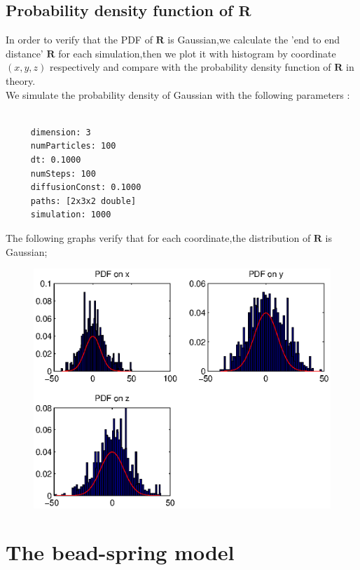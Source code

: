 \documentclass{article}
\begin{document}
\subsection{Probability density function of $\bm{R}$ }
In order to verify that the PDF of $\bm{R}$ is Gaussian,we calculate the 'end to end distance' $\bm{R}$ for each simulation,then we plot it with histogram by coordinate $(x,y,z)$ respectively and compare with the probability density function of $\bm{R}$ in theory. \\
We simulate the probability density of Gaussian  with the following parameters :
\begin{lstlisting}

     dimension: 3
     numParticles: 100
     dt: 0.1000
     numSteps: 100
     diffusionConst: 0.1000
     paths: [2x3x2 double]
     simulation: 1000

\end{lstlisting}
The following graphs verify that for each coordinate,the distribution of $\bm{R}$ is Gaussian;
\begin{figure}[H]
	\includegraphics[width=6.2in]{PDF.eps} 
	 
	 \end{figure}
	 \section{The bead-spring model}
\end{document}
